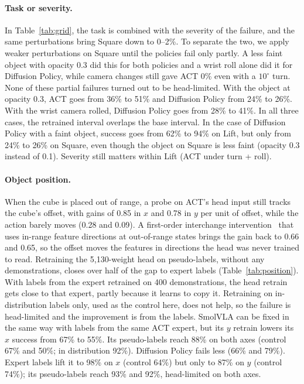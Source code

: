 \documentclass[10pt]{article}
\begin{document}
\paragraph{Task or severity.} In Table~\ref{tab:grid}, the task is combined with the severity of the failure,
and the same perturbations bring Square down to 0--2\%. To separate the two,
we apply weaker perturbations on Square until the policies fail only partly. A less faint object
with opacity 0.3 did this for both policies and a wrist roll alone did it for Diffusion Policy, while camera
changes still gave ACT 0\% even with a $10^\circ$ turn. None of these partial
failures turned out to be head-limited. With the object at opacity 0.3, ACT goes from 36\% to 51\% and
Diffusion Policy from 24\% to 26\%. With the wrist camera rolled, Diffusion Policy goes from 28\% to 41\%.
In all three cases, the retrained interval overlaps the base interval. In the case of
Diffusion Policy with a faint object, success goes from 62\% to 94\% on Lift, but only from 24\% to 26\% on Square, even though the object on
Square is less faint (opacity 0.3 instead of 0.1). Severity still matters within Lift (ACT under turn + roll).

\paragraph{Object position.} When the cube is placed out of range, a probe on ACT's head input still
tracks the cube's offset, with gains of 0.85 in $x$ and 0.78 in $y$ per unit of offset,
while the action barely moves (0.28 and 0.09). A first-order
interchange intervention~\citep{geiger2021causal} that uses in-range feature directions at out-of-range
states brings the gain back to 0.66 and 0.65, so the offset moves the features in directions the head
was never trained to read. Retraining the 5{,}130-weight head on
pseudo-labels, without any demonstrations, closes over half of the gap to expert labels (Table~\ref{tab:position}).
With labels from the expert retrained on 400 demonstrations, the head retrain gets close to that expert,
partly because it learns to copy it.
Retraining on in-distribution labels only, used as the
control here, does not help, so the failure is head-limited and the improvement is from the labels.
SmolVLA can be fixed in the same way with labels from the same ACT expert, but its $y$ retrain lowers its
$x$ success from 67\% to 55\%. Its pseudo-labels reach 88\% on both axes (control 67\% and 50\%; in distribution 92\%). Diffusion Policy fails less (66\% and 79\%). Expert labels lift it to 98\% on $x$
(control 64\%) but only to 87\% on $y$ (control 74\%); its pseudo-labels reach 93\% and 92\%, head-limited on both axes.
\end{document}
